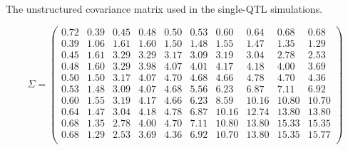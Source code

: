\documentclass[letterpaper,twoside]{article}
\begin{document}
\clearpage


\begin{table}[p]
\centering
  \caption{The unstructured covariance matrix used in the single-QTL simulations.}
\begin{equation*}
  \Sigma = \begin{pmatrix}
0.72 & 0.39 & 0.45 & 0.48 & 0.50 & 0.53 & 0.60 & 0.64 & 0.68 & 0.68 \\
0.39 & 1.06 & 1.61 & 1.60 & 1.50 & 1.48 & 1.55 & 1.47 & 1.35 & 1.29 \\
0.45 & 1.61 & 3.29 & 3.29 & 3.17 & 3.09 & 3.19 & 3.04 & 2.78 & 2.53 \\
0.48 & 1.60 & 3.29 & 3.98 & 4.07 & 4.01 & 4.17 & 4.18 & 4.00 & 3.69 \\
0.50 & 1.50 & 3.17 & 4.07 & 4.70 & 4.68 & 4.66 & 4.78 & 4.70 & 4.36 \\
0.53 & 1.48 & 3.09 & 4.07 & 4.68 & 5.56 & 6.23 & 6.87 & 7.11 & 6.92 \\
0.60 & 1.55 & 3.19 & 4.17 & 4.66 & 6.23 & 8.59 & 10.16 & 10.80 & 10.70 \\
0.64 & 1.47 & 3.04 & 4.18 & 4.78 & 6.87 & 10.16 & 12.74 & 13.80 & 13.80 \\
0.68 & 1.35 & 2.78 & 4.00 & 4.70 & 7.11 & 10.80 & 13.80 & 15.33 & 15.35 \\
0.68 & 1.29 & 2.53 & 3.69 & 4.36 & 6.92 & 10.70 & 13.80 & 15.35 & 15.77 \\
  \end{pmatrix}
\end{equation*}
\end{table}
\end{document}
